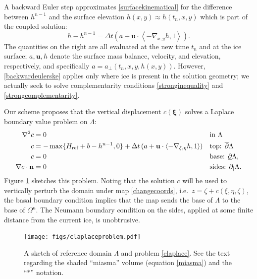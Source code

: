 \documentclass[letterpaper,final,12pt,reqno]{amsart}
\newcommand{\grad}{\nabla}
\newcommand{\bn}{\mathbf{n}}
\newcommand{\bu}{\mathbf{u}}
\newcommand{\bxi}{\bm{\xi}}
\newcommand{\Href}{H_{\text{ref}}}
\begin{document}
A backward Euler step approximates \eqref{surfacekinematical} for the difference between $h^{n-1}$ and the surface elevation $h(x,y) \approx h(t_n,x,y)$ which is part of the coupled solution:
\begin{equation}
h - h^{n-1} = \Delta t\left(a + \bu \cdot \left<-\grad_{x,y} h,1\right>\right). \label{backwardeulerske}
\end{equation}
The quantities on the right are all evaluated at the new time $t_n$ and at the ice surface; $a,\bu,h$ denote the surface mass balance, velocity, and elevation, respectively, and specifically $a=a_{\perp}(t_n,x,y,h(x,y))$.  However, \eqref{backwardeulerske} applies only where ice is present in the solution geometry; we actually seek to solve complementarity conditions \eqref{stronginequality} and \eqref{strongcomplementarity}.

Our scheme proposes that the vertical displacement $c(\bxi)$ solves a Laplace boundary value problem on $\Lambda$:
\begin{align}
        \grad^2 c &= 0 &&\text{in } \Lambda \label{claplace} \\
                c &= -\max\{\Href + b - h^{n-1},0\} + \Delta t\,(a + \bu \cdot \left<-\grad_{\xi,\eta}h,1\right>) &&\text{top: } \overline{\partial} \Lambda \notag \\
                c &= 0 &&\text{base: } \underline{\partial} \Lambda, \notag \\
 \grad c\cdot \bn &= 0 &&\text{sides: } \partial_{|} \Lambda. \notag
\end{align}
Figure \ref{fig:claplaceproblem} sketches this problem.  Noting that the solution $c$ will be used to vertically perturb the domain under map \eqref{changecoords}, i.e.~$z=\zeta+c(\xi,\eta,\zeta)$, the basal boundary condition implies that the map sends the base of $\Lambda$ to the base of $\Omega^n$.  The Neumann boundary condition on the sides, applied at some finite distance from the current ice, is unobtrusive.

\begin{figure}[ht]
\begin{center}
\texttt{[image: figs/claplaceproblem.pdf]}
\end{center}
\caption{A sketch of reference domain $\Lambda$ and problem \eqref{claplace}.  See the text regarding the shaded ``miasma'' volume (equation \eqref{miasma}) and the ``$\ast$'' notation.}
\label{fig:claplaceproblem}
\end{figure}
\end{document}
